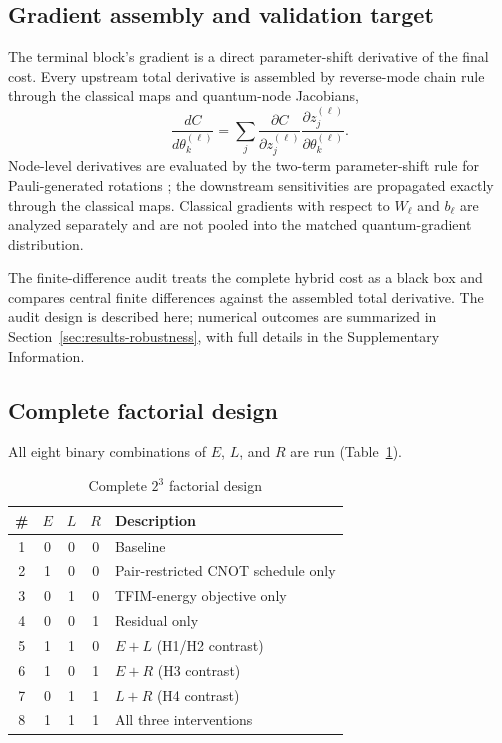 \documentclass[pdflatex,sn-basic,Numbered]{sn-jnl}
\begin{document}
\subsection{Gradient assembly and validation target}

The terminal block's gradient is a direct parameter-shift derivative of the final cost. Every upstream total derivative is assembled by reverse-mode chain rule through the classical maps and quantum-node Jacobians,
\[
\frac{dC}{d\theta_k^{(\ell)}}
=\sum_j
\frac{\partial C}{\partial z_j^{(\ell)}}
\frac{\partial z_j^{(\ell)}}{\partial\theta_k^{(\ell)}}.
\]
Node-level derivatives are evaluated by the two-term parameter-shift rule for Pauli-generated rotations \cite{mitarai2018quantum,schuld2019evaluating}; the downstream sensitivities are propagated exactly through the classical maps. Classical gradients with respect to $W_\ell$ and $b_\ell$ are analyzed separately and are not pooled into the matched quantum-gradient distribution.

The finite-difference audit treats the complete hybrid cost as a black box and compares central finite differences against the assembled total derivative. The audit design is described here; numerical outcomes are summarized in Section~\ref{sec:results-robustness}, with full details in the Supplementary Information.

\subsection{Complete factorial design}

All eight binary combinations of $E$, $L$, and $R$ are run (Table~\ref{tab:configurations}).

\begin{table}[t]
\centering
\begin{tabular}{cccc l}
\toprule
\# & $E$ & $L$ & $R$ & Description \\
\midrule
1 & 0 & 0 & 0 & Baseline \\
2 & 1 & 0 & 0 & Pair-restricted CNOT schedule only \\
3 & 0 & 1 & 0 & TFIM-energy objective only \\
4 & 0 & 0 & 1 & Residual only \\
5 & 1 & 1 & 0 & $E+L$ (H1/H2 contrast) \\
6 & 1 & 0 & 1 & $E+R$ (H3 contrast) \\
7 & 0 & 1 & 1 & $L+R$ (H4 contrast) \\
8 & 1 & 1 & 1 & All three interventions \\
\bottomrule
\end{tabular}
\caption{Complete $2^3$ factorial design}
\label{tab:configurations}
\end{table}
\end{document}
